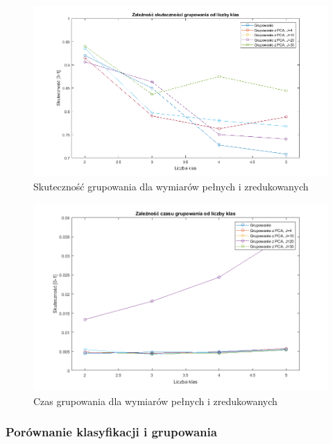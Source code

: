\begin{figure}[H]
	\centering
	\hspace*{-0.8in}
	\includegraphics[scale = 0.7]{img/acc_from_classes_group.png}
	\caption{Skuteczność grupowania dla wymiarów pełnych i zredukowanych}  
	\label{rys:acc_from_classes_group} 
\end{figure}

\begin{figure}[H]
	\centering
	\hspace*{-0.8in}
	\includegraphics[scale = 0.7]{img/time_from_classes_group.png}
	\caption{Czas grupowania dla wymiarów pełnych i zredukowanych}  
	\label{rys:time_from_classes_group} 
\end{figure}

\subsubsection{Porównanie klasyfikacji i grupowania}

